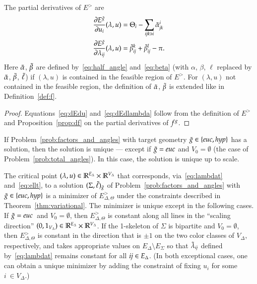 \documentclass[Thesis]{subfiles}
\begin{document}
\begin{proposition}
  \label{prop:dE}
  The partial derivatives of $E^{\gt}$ are
  \begin{align}
    \label{eq:dEdu}
    \frac{\partial E^{\tilde{g}}}{\partial u_i}(\lambda,u) &= \Theta_i - \sum_{{\it
      ijk}\ni i}\tilde{\alpha}_{\it jk}^i \\
    \label{eq:dEdlambda}
    \frac{\partial E^{\tilde{g}}}{\partial \lambda_{\it ij}}(\lambda,u) &= \tilde{\beta}_{\it ij}^k + \tilde{\beta}_{\it ij}^l -\pi.
  \end{align}
  Here $\tilde{\alpha}$, $\tilde{\beta}$ are defined by~\eqref{eq:half_angle}
  and~\eqref{eq:beta} (with $\alpha$, $\beta$, $\ell$ replaced by
  $\tilde{\alpha}$, $\tilde{\beta}$, $\tilde{\ell}$) if\/ $(\lambda,u)$ is contained in the
  feasible region of $E^{\gt}$. For\/ $(\lambda,u)$ not contained in
  the feasible region, the definition of $\tilde{\alpha}$, $\tilde{\beta}$ is
  extended like in Definition~\ref{def:f}.
\end{proposition}

\begin{proof}
  Equations~\eqref{eq:dEdu} and~\eqref{eq:dEdlambda} follow from the
  definition of $E^{\gt}$ and Proposition~\ref{prop:df} on the partial
  derivatives of $f^{g}$.
\end{proof}

\begin{theorem}
  \label{thm:uniqueness}
  If Problem~\ref{prob:factors_and_angles} with target geometry 
  $\gt\in\{\euc,\hyp\}$
  has a solution, then the solution is unique --- except if $\gt=\euc$
  and $V_{0}=\emptyset$ (the case of
  Problem~\ref{prob:total_angles}). In this case, the solution is
  unique up to scale.

  The critical point\/ $(\lambda,
  u)\in\mathbb R^{E_{\Delta}}\times\mathbb R^{V_{\Delta}}$ that corresponds,
  via~\eqref{eq:lambdat} and~\eqref{eq:ellt}, to a solution
  $(\Sigma,\tilde{\ell})_{\tilde{g}}$ of Problem~\ref{prob:factors_and_angles} with
  $\gt\in\{\euc,\hyp\}$ is a minimizer of $E^{\gt}_{\Delta,\Theta}$
  under the constraints described in
  Theorem~\ref{thm:variational}. The minimizer is unique except in the
  following cases. If $\gt=\euc$\, and $V_{0}=\emptyset$, then
  $E^{\gt}_{\Delta,\Theta}$ is constant along all lines in the
  ``scaling direction''
  $(0,1_{V_{\Delta}})\in\mathbb R^{E_{\Delta}}\times\mathbb R^{V_{\Delta}}$. If the
  1-skeleton of\/ $\Sigma$ is bipartite and $V_{0}=\emptyset$, then
  $E^{\gt}_{\Delta,\Theta}$ is constant in the direction that is $\pm
  1$ on the two color classes of $V_{\Delta}$, respectively, and takes
  appropriate values on $E_{\Delta}\setminus E_{\Sigma}$ so that
  $\tilde{\lambda}_{\it ij}$ defined by~\eqref{eq:lambdat} remains constant
  for all ${\it ij}\in E_{\Delta}$. (In both exceptional cases, one
  can obtain a unique minimizer by adding the constraint of fixing
  $u_{i}$ for some $i~\in V_{\Delta}$.)
\end{theorem}
\end{document}
